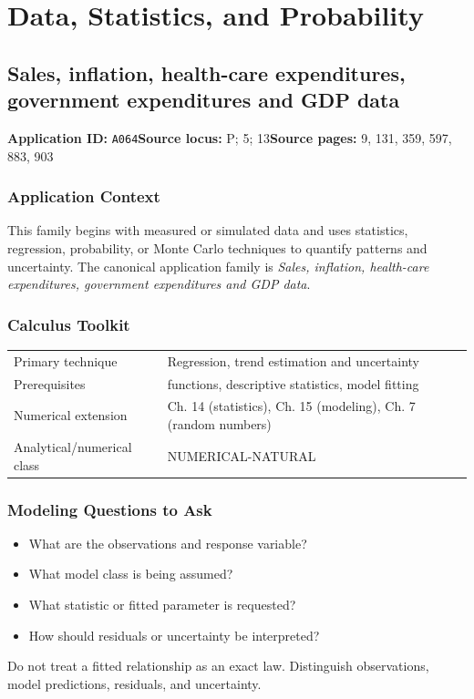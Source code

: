 \documentclass[11pt]{book}
\newcommand{\pid}[1]{\texttt{#1}}
\begin{document}
\part{Data, Statistics, and Probability}
\chapter{Sales, inflation, health-care expenditures, government expenditures and GDP data}\label{app:A064}
\textbf{Application ID:} \pid{A064}\quad \textbf{Source locus:} P; 5; 13\quad \textbf{Source pages:} 9, 131, 359, 597, 883, 903
\section*{Application Context}
This family begins with measured or simulated data and uses statistics, regression, probability, or Monte Carlo techniques to quantify patterns and uncertainty. The canonical application family is \emph{Sales, inflation, health-care expenditures, government expenditures and GDP data}.
\section*{Calculus Toolkit}
\begin{tabularx}{\textwidth}{@{}lX@{}}\toprule
Primary technique & Regression, trend estimation and uncertainty \\
Prerequisites & functions, descriptive statistics, model fitting \\
Numerical extension & Ch. 14 (statistics), Ch. 15 (modeling), Ch. 7 (random numbers) \\
Analytical/numerical class & NUMERICAL-NATURAL \\
\bottomrule\end{tabularx}
\section*{Modeling Questions to Ask}\begin{itemize}
\item What are the observations and response variable?
\item What model class is being assumed?
\item What statistic or fitted parameter is requested?
\item How should residuals or uncertainty be interpreted?
\end{itemize}
\begin{errorbox}Do not treat a fitted relationship as an exact law. Distinguish observations, model predictions, residuals, and uncertainty.\end{errorbox}
\end{document}
